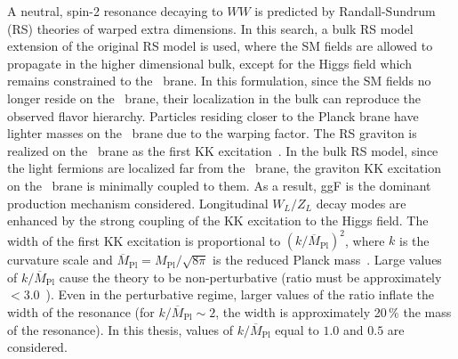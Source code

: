 A neutral, spin-2 resonance decaying to $WW$ is predicted by Randall-Sundrum (RS) theories of warped extra dimensions. In this search, a bulk RS model~\cite{rs_graviton} extension of the original RS model is used, where the SM fields are allowed to propagate in the higher dimensional bulk, except for the Higgs field which remains constrained to the \TeV\, brane. In this formulation, since the SM fields no longer reside on the \TeV\, brane, their localization in the bulk can reproduce the observed flavor hierarchy. Particles residing closer to the Planck brane have lighter masses on the \TeV\, brane due to the warping factor. The RS graviton is realized on the \TeV\, brane as the first KK excitation~\cite{kaluza_klein_mode}.
In the bulk RS model, since the light fermions are localized far from the \TeV\, brane, the graviton KK excitation on the \TeV\, brane is minimally coupled to them. As a result, ggF is the dominant production mechanism considered. Longitudinal $W_L/Z_L$ decay modes are enhanced by the strong coupling of the KK excitation to the Higgs field.
The width of the first KK excitation is proportional to $(k/\overline{M}_{\textrm{Pl}})^2$, where $k$ is the curvature scale and $\overline{M}_{\textrm{Pl}}=M_{\textrm{Pl}}/\sqrt{8\pi}$ is the reduced Planck mass~\cite{grav_width}. 
Large values of $k/\overline{M}_{\textrm{Pl}}$ cause the theory to be non-perturbative (ratio must be approximately $<3.0$~\cite{rs_graviton}). Even in the perturbative regime, larger values of the ratio inflate the width of the resonance (for $k/\overline{M}_{\textrm{Pl}}\sim2$, the width is approximately 20\,\% the mass of the resonance). In this thesis, values of  $k/\overline{M}_{\textrm{Pl}}$ equal to $1.0$ and $0.5$ are considered.






